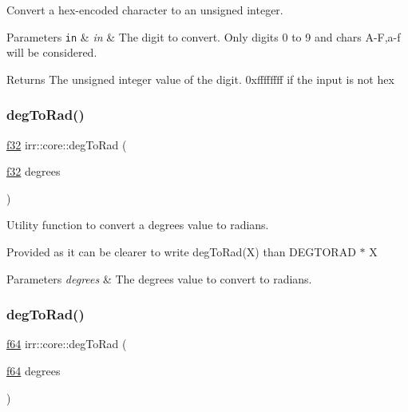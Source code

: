 Convert a hex-\/encoded character to an unsigned integer. 


\begin{DoxyParams}[1]{Parameters}
\mbox{\tt in}  & {\em in} & The digit to convert. Only digits 0 to 9 and chars A-\/F,a-\/f will be considered. \\
\hline
\end{DoxyParams}
\begin{DoxyReturn}{Returns}
The unsigned integer value of the digit. 0xffffffff if the input is not hex 
\end{DoxyReturn}
\mbox{\label{namespaceirr_1_1core_ad58b3d0e755a4f25ad19d5f5d4fb0280}} 
\subsubsection{\texorpdfstring{deg\+To\+Rad()}{degToRad()}\hspace{0.1cm}{\footnotesize\ttfamily [1/2]}}
{\footnotesize\ttfamily \hyperlink{namespaceirr_a0277be98d67dc26ff93b1a6a1d086b07}{f32} irr\+::core\+::deg\+To\+Rad (\begin{DoxyParamCaption}\item[{\hyperlink{namespaceirr_a0277be98d67dc26ff93b1a6a1d086b07}{f32}}]{degrees }\end{DoxyParamCaption})\hspace{0.3cm}{\ttfamily [inline]}}



Utility function to convert a degrees value to radians. 

Provided as it can be clearer to write deg\+To\+Rad(\+X) than D\+E\+G\+T\+O\+R\+AD $\ast$ X 
\begin{DoxyParams}{Parameters}
{\em degrees} & The degrees value to convert to radians. \\
\hline
\end{DoxyParams}
\mbox{\label{namespaceirr_1_1core_a2def535b4f391ceb86ec0497cbb4bf80}} 
\subsubsection{\texorpdfstring{deg\+To\+Rad()}{degToRad()}\hspace{0.1cm}{\footnotesize\ttfamily [2/2]}}
{\footnotesize\ttfamily \hyperlink{namespaceirr_a1325b02603ad449f92c68fc640af9b28}{f64} irr\+::core\+::deg\+To\+Rad (\begin{DoxyParamCaption}\item[{\hyperlink{namespaceirr_a1325b02603ad449f92c68fc640af9b28}{f64}}]{degrees }\end{DoxyParamCaption})\hspace{0.3cm}{\ttfamily [inline]}}



